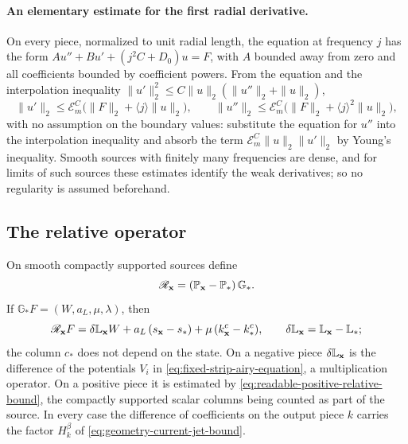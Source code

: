 \paragraph{An elementary estimate for the first radial derivative.}
On every piece, normalized to unit radial length, the equation at
frequency $j$ has the form $Au''+Bu'+(j^2C+D_0)u=F$, with $A$ bounded
away from zero and all coefficients bounded by coefficient powers.
From the equation and the interpolation inequality
$\|u'\|_2^2\le C\|u\|_2(\|u''\|_2+\|u\|_2)$,
\begin{equation}\label{eq:vol-reference-first-normal-bound}
 \|u'\|_2\le\mathcal E_m^C\bigl(\|F\|_2+\langle j\rangle\|u\|_2\bigr),
 \qquad
 \|u''\|_2\le\mathcal E_m^C\bigl(\|F\|_2+\langle j\rangle^2\|u\|_2\bigr),
\end{equation}
with no assumption on the boundary values: substitute the equation
for $u''$ into the interpolation inequality and absorb the term
$\mathcal E_m^C\|u\|_2\|u'\|_2$ by Young's inequality. Smooth sources
with finitely many frequencies are dense, and for limits of such
sources these estimates identify the weak derivatives; so no
regularity is assumed beforehand.

\subsection{The relative operator}
\label{subsec:relative}

On smooth compactly supported sources define
\[
 \mathscr R_{\mathbf x}=(\mathbb P_{\mathbf x}-\mathbb P_*)\,\mathbb G_* .
\]
If $\mathbb G_*F=(W,a_L,\mu,\lambda)$, then
\begin{equation}\label{eq:vol-normalized-relative-identity}
 \mathscr R_{\mathbf x}F
 =\delta\mathbb L_{\mathbf x}W
      +a_L\,(s_{\mathbf x}-s_*)+\mu\,(k_{\mathbf x}^c-k_*^c),
 \qquad\delta\mathbb L_{\mathbf x}=\mathbb L_{\mathbf x}-\mathbb L_* ;
\end{equation}
the column $c_*$ does not depend on the state. On a negative piece
$\delta\mathbb L_{\mathbf x}$ is the difference of the potentials $V_i$ in
\eqref{eq:fixed-strip-airy-equation}, a multiplication operator. On a
positive piece it is estimated by
\eqref{eq:readable-positive-relative-bound}, the compactly supported
scalar columns being counted as part of the source. In every case the
difference of coefficients on the output piece $k$ carries the factor
$H_k^\beta$ of \eqref{eq:geometry-current-jet-bound}.

